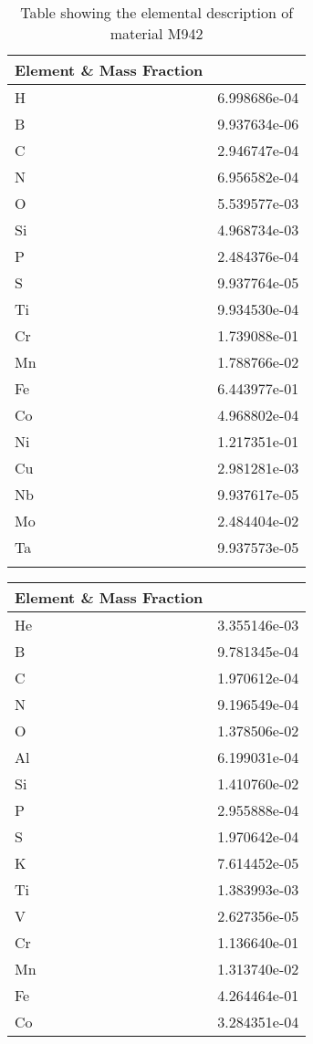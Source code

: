 \begin{centering}
\begin{longtable}[ht!]
{ p{} | p{} }
\hline
Element \& Mass Fraction\\
\hline
H &  6.998686e-04\\
B &  9.937634e-06\\
C &  2.946747e-04\\
N &  6.956582e-04\\
O &  5.539577e-03\\
Si &  4.968734e-03\\
P &  2.484376e-04\\
S &  9.937764e-05\\
Ti &  9.934530e-04\\
Cr &  1.739088e-01\\
Mn &  1.788766e-02\\
Fe &  6.443977e-01\\
Co &  4.968802e-04\\
Ni &  1.217351e-01\\
Cu &  2.981281e-03\\
Nb &  9.937617e-05\\
Mo &  2.484404e-02\\
Ta &  9.937573e-05\\
\caption{Table showing the elemental description of material M942}
\label{table:material_EPP3L}
\end{longtable}
\clearpage
\begin{longtable}[ht!]
  { p{} | p{} }
\hline
Element \& Mass Fraction\\
\hline
He &  3.355146e-03\\
B &  9.781345e-04\\
C &  1.970612e-04\\
N &  9.196549e-04\\
O &  1.378506e-02\\
Al &  6.199031e-04\\
Si &  1.410760e-02\\
P &  2.955888e-04\\
S &  1.970642e-04\\
K &  7.614452e-05\\
Ti &  1.383993e-03\\
V &  2.627356e-05\\
Cr &  1.136640e-01\\
Mn &  1.313740e-02\\
Fe &  4.264464e-01\\
Co &  3.284351e-04\\

\end{longtable}
\end{centering}
